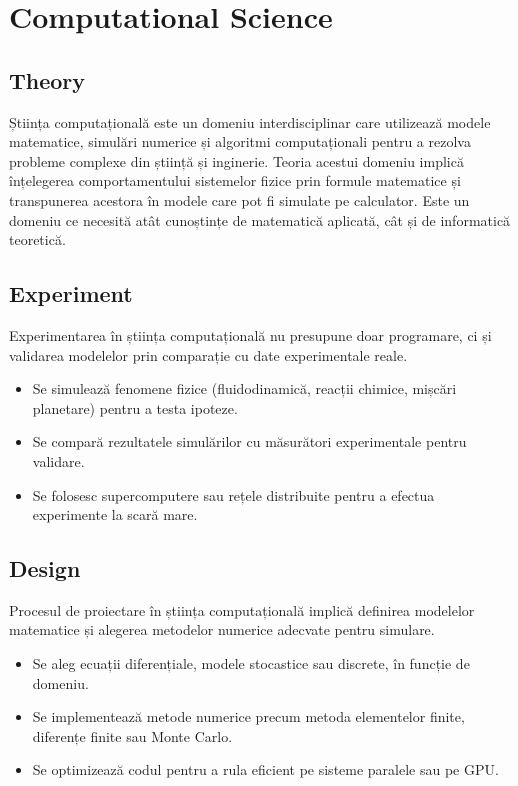 \documentclass[12pt, letterpaper]{article}
\begin{document}
\newpage
\section{Computational Science}

\subsection*{Theory}
Știința computațională este un domeniu interdisciplinar care utilizează modele matematice, simulări numerice și algoritmi computaționali pentru a rezolva probleme complexe din știință și inginerie. Teoria acestui domeniu implică înțelegerea comportamentului sistemelor fizice prin formule matematice și transpunerea acestora în modele care pot fi simulate pe calculator. Este un domeniu ce necesită atât cunoștințe de matematică aplicată, cât și de informatică teoretică.

\subsection*{Experiment}
Experimentarea în știința computațională nu presupune doar programare, ci și validarea modelelor prin comparație cu date experimentale reale.
\begin{itemize}
    \item Se simulează fenomene fizice (fluidodinamică, reacții chimice, mișcări planetare) pentru a testa ipoteze.
    \item Se compară rezultatele simulărilor cu măsurători experimentale pentru validare.
    \item Se folosesc supercomputere sau rețele distribuite pentru a efectua experimente la scară mare.
\end{itemize}

\subsection*{Design}
Procesul de proiectare în știința computațională implică definirea modelelor matematice și alegerea metodelor numerice adecvate pentru simulare.
\begin{itemize}
    \item Se aleg ecuații diferențiale, modele stocastice sau discrete, în funcție de domeniu.
    \item Se implementează metode numerice precum metoda elementelor finite, diferențe finite sau Monte Carlo.
    \item Se optimizează codul pentru a rula eficient pe sisteme paralele sau pe GPU.
\end{itemize}
\end{document}
